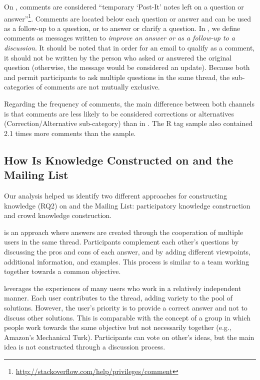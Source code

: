 On \SO, comments are considered ``temporary `Post-It' notes left on a question or answer''\footnote{\url{http://stackoverflow.com/help/privileges/comment}}. Comments are located below each question or answer and can be used as a follow-up to a question, or to answer or clarify a question. In \RH, we define comments as messages written to \emph{improve an answer or as a follow-up to a discussion}. It should be noted that in order for an email to qualify as a comment, it should not be written by the person who asked or answered the original question (otherwise, the message would be considered an update).
Because both \SO and \RH permit participants to ask multiple questions in the same thread, the sub-categories of comments are not mutually exclusive.  

Regarding the frequency of comments, the main difference between both channels is that \SO comments are less likely to be considered corrections or alternatives (Correction/Alternative sub-category) than in \RH. The \SO R tag sample also contained 2.1 times more comments than the \RH sample.

\subsection{How Is Knowledge Constructed on \SO and the \RH Mailing List}
\label{sec:rq2}

Our analysis helped us identify two different approaches for constructing knowledge (RQ2) on \SO and the \RH Mailing List: participatory knowledge construction and crowd knowledge construction.

\begin{description}[itemsep=2pt, topsep=0pt, leftmargin=1em, parsep=0pt]
\item[Participatory knowledge construction] is an approach where answers are created through the cooperation of multiple users in the same thread. Participants complement each other's questions by discussing the pros and
  cons of each answer, and by adding different viewpoints, additional information, and examples.
  This process is similar to a team working together towards
  a common objective.

\item[Crowd knowledge construction] leverages the experiences of many users who work in a relatively
  independent manner. Each user contributes to the thread, adding variety to the pool of solutions. However, the user's priority is to provide a correct answer and not to discuss other solutions.
  This is comparable with the concept of a group in which people work towards the same objective but not necessarily together (e.g., Amazon's Mechanical Turk). Participants can vote on other's ideas, but the
  main idea is not constructed through a discussion process.
\end{description}

